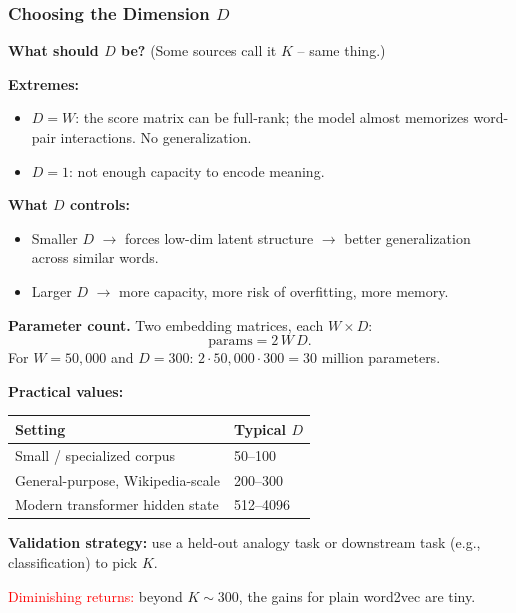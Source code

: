\documentclass[notes,11pt, aspectratio=169]{beamer}
\begin{document}
\begin{frame}
\frametitle{Choosing the Dimension $D$}

\textbf{What should $D$ be?} (Some sources call it $K$ -- same thing.)

\vspace{6pt}
\textbf{Extremes:}
\begin{itemize}
    \item $D = W$: the score matrix can be full-rank; the model almost memorizes word-pair interactions. No generalization.
    \item $D = 1$: not enough capacity to encode meaning.
\end{itemize}

\vspace{6pt}
\textbf{What $D$ controls:}
\begin{itemize}
    \item Smaller $D$ $\to$ forces low-dim latent structure $\to$ better generalization across similar words.
    \item Larger $D$ $\to$ more capacity, more risk of overfitting, more memory.
\end{itemize}

\vspace{6pt}
\textbf{Parameter count.} Two embedding matrices, each $W \times D$:
\[
    \text{params} = 2 \, W \, D.
\]
For $W = 50{,}000$ and $D = 300$: $2 \cdot 50{,}000 \cdot 300 = 30$ million parameters.

\vspace{6pt}
\textbf{Practical values:}
\begin{center}
\renewcommand{\arraystretch}{1.15}
\small
\begin{tabular}{ll}
\toprule
\textbf{Setting} & \textbf{Typical $D$} \\
\midrule
Small / specialized corpus & 50--100 \\
General-purpose, Wikipedia-scale & 200--300 \\
Modern transformer hidden state & 512--4096 \\
\bottomrule
\end{tabular}
\end{center}

\vspace{8pt}
\textbf{Validation strategy:} use a held-out analogy task or downstream task (e.g., classification) to pick $K$.

\vspace{4pt}
\textcolor{red}{Diminishing returns:} beyond $K \sim 300$, the gains for plain word2vec are tiny.
\end{frame}
\end{document}
